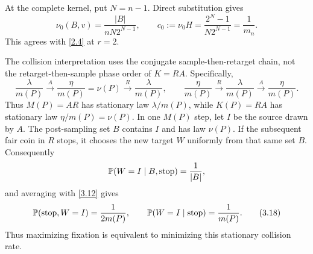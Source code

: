At the complete kernel, put $N=n-1$.  Direct substitution gives
\[
 \nu_0(B,v)=\frac{|B|}{nN2^{N-1}},\qquad
 c_0:=\nu_0H=\frac{2^N-1}{N2^{N-1}}=\frac1{m_n}.             \tag{3.17}\label{3.17}
\]
This agrees with \eqref{2.4} at $r=2$.

The collision interpretation uses the conjugate sample-then-retarget chain,
not the retarget-then-sample phase order of $K=RA$.  Specifically,
\[
 \frac{\lambda}{m(P)}\xrightarrow{\ A\ }
 \frac{\eta}{m(P)}=\nu(P)\xrightarrow{\ R\ }
 \frac{\lambda}{m(P)},
 \qquad
 \frac{\eta}{m(P)}\xrightarrow{\ R\ }
 \frac{\lambda}{m(P)}\xrightarrow{\ A\ }
 \frac{\eta}{m(P)}.                                      \tag{3.18a}\label{3.18a}
\]
Thus $M(P)=AR$ has stationary law $\lambda/m(P)$, while $K(P)=RA$ has
stationary law $\eta/m(P)=\nu(P)$.  In one $M(P)$ step, let $I$ be the source
drawn by $A$.  The post-sampling set $B$ contains $I$ and has law $\nu(P)$.
If the subsequent fair coin in $R$ stops, it chooses the new target $W$
uniformly from that same set $B$.  Consequently
\[
 \mathbb P(W=I\mid B,\mathrm{stop})=\frac1{|B|},
\]
and averaging with \eqref{3.12} gives
\[
 \mathbb P(\mathrm{stop},W=I)=\frac1{2m(P)},\qquad
 \mathbb P(W=I\mid\mathrm{stop})=\frac1{m(P)}.                  \tag{3.18}\label{3.18}
\]
Thus maximizing fixation is equivalent to minimizing this stationary
collision rate.
